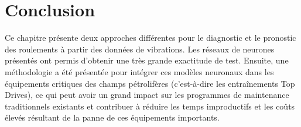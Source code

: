 \section{Conclusion}
Ce chapitre présente deux approches différentes pour le diagnostic et le pronostic des roulements à partir des données de vibrations. Les réseaux de neurones présentés ont permis d'obtenir une très grande exactitude de test. Ensuite, une méthodologie a été présentée pour intégrer ces modèles neuronaux dans les équipements critiques des champs pétrolifères (c'est-à-dire les entraînements Top Drives), ce qui peut avoir un grand impact sur les programmes de maintenance traditionnels existants et contribuer à réduire les temps improductifs et les coûts élevés résultant de la panne de ces équipements importants.

